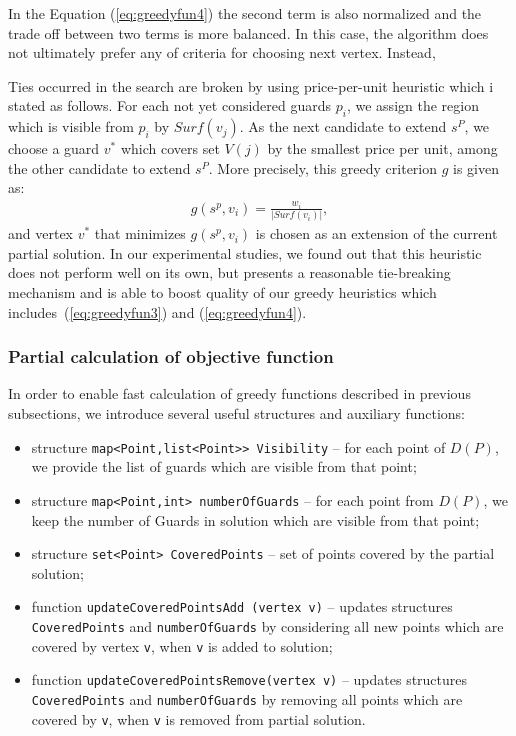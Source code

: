 \documentclass[runningheads,a4paper]{elsarticle}
\begin{document}
	
	In the Equation  (\ref{eq:greedyfun4}) the second term is also normalized and the trade off between two terms is more balanced.
	In this case, the algorithm does not  ultimately prefer any of criteria for choosing next vertex. Instead,  
	
	
	Ties occurred in the search are broken by using  price-per-unit heuristic which i stated as follows.
	For each not yet considered guards $p_i$, we assign the region which is visible from $p_i$ by $Surf(v_j)$. As the next candidate to extend $s^P$, we choose a guard $v^*$ which covers set $V(j)$ by the smallest price per unit, among the other candidate to extend $s^P$. More precisely, this greedy criterion $g$ is given as:
	\begin{align}
	g(s^p, v_i) = \frac{w_{i}}{|Surf({v_i})|},
	\end{align}
	and vertex $v^*$ that minimizes $g(s^p, v_i)$ is chosen as an extension of the current partial solution.
	In our experimental studies, we found out that this heuristic does not perform well on its own, but presents a reasonable tie-breaking mechanism and is able to boost quality of our greedy heuristics which includes~(\ref{eq:greedyfun3}) and (\ref{eq:greedyfun4}). 
	\subsubsection{Partial calculation of objective function}
	
	In order to enable fast calculation of greedy functions described in previous subsections, we introduce several useful structures and auxiliary functions:
	\begin{itemize}
		\item structure \texttt{map<Point,list<Point>> Visibility} -- for each point of $D(P)$, we provide the list of guards which are visible from that point; 
		\item structure \texttt{map<Point,int> numberOfGuards} -- for each point from $D(P)$,  we keep the number of Guards in solution which are visible from that point;
		\item structure \texttt{set<Point> CoveredPoints} -- set of points covered by the partial solution;
		\item function \texttt{updateCoveredPointsAdd (vertex v)} -- updates  structures \texttt{CoveredPoints} and \texttt{numberOfGuards} by considering all new points which are covered by vertex \texttt{v}, when \texttt{v} is added to solution;
		\item function \texttt{updateCoveredPointsRemove(vertex v)} -- updates  structures \texttt{CoveredPoints} and \texttt{numberOfGuards} by removing all points which are covered by \texttt{v}, when \texttt{v} is removed from partial solution.
	\end{itemize}
	
\end{document}

